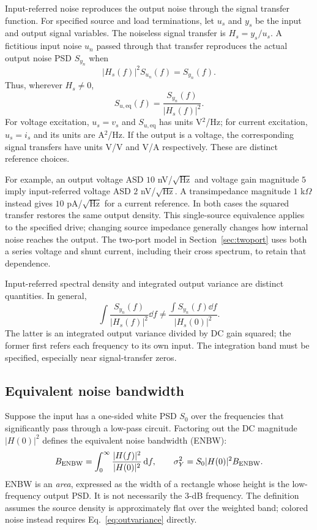 Input-referred noise reproduces the output noise through the signal transfer function. For specified source and load terminations, let $u_s$ and $y_s$ be the input and output signal variables. The noiseless signal transfer is $H_s=y_s/u_s$. A fictitious input noise $u_n$ passed through that transfer reproduces the actual output noise PSD $S_{y_n}$ when
\[
|H_s(f)|^2S_{u_n}(f)=S_{y_n}(f).
\]
Thus, wherever $H_s\neq0$,
\begin{equation}
\boxed{S_{u,\mathrm{eq}}(f)=\frac{S_{y_n}(f)}{|H_s(f)|^2}.}
\end{equation}
For voltage excitation, $u_s=v_s$ and $S_{u,\mathrm{eq}}$ has units V$^2$/Hz; for current excitation, $u_s=i_s$ and its units are A$^2$/Hz. If the output is a voltage, the corresponding signal transfers have units V/V and V/A respectively. These are distinct reference choices.
\InputReferralFigure

For example, an output voltage ASD $10$ nV/$\sqrt{\mathrm{Hz}}$ and voltage gain magnitude $5$ imply input-referred voltage ASD $2$ nV/$\sqrt{\mathrm{Hz}}$. A transimpedance magnitude $1$ k$\Omega$ instead gives $10$ pA/$\sqrt{\mathrm{Hz}}$ for a current reference. In both cases the squared transfer restores the same output density. This single-source equivalence applies to the specified drive; changing source impedance generally changes how internal noise reaches the output. The two-port model in Section~\ref{sec:twoport} uses both a series voltage and shunt current, including their cross spectrum, to retain that dependence.

Input-referred spectral density and integrated output variance are distinct quantities. In general,
\[
\int\frac{S_{y_n}(f)}{|H_s(f)|^2}\dd f
\neq\frac{\int S_{y_n}(f)\dd f}{|H_s(0)|^2}.
\]
The latter is an integrated output variance divided by DC gain squared; the former first refers each frequency to its own input. The integration band must be specified, especially near signal-transfer zeros.

\subsection{Equivalent noise bandwidth}
\label{sec:shaping}
Suppose the input has a one-sided white PSD $S_0$ over the frequencies that significantly pass through a low-pass circuit. Factoring out the DC magnitude $|H(0)|^2$ defines the equivalent noise bandwidth (ENBW):
\begin{equation}
B_{\mathrm{ENBW}}=\int_0^\infty\frac{|H(f)|^2}{|H(0)|^2}\,\mathrm d f,
\qquad \sigma_Y^2=S_0|H(0)|^2B_{\mathrm{ENBW}}.\label{eq:enbw}
\end{equation}
ENBW is an \emph{area}, expressed as the width of a rectangle whose height is the low-frequency output PSD. It is not necessarily the $3$-dB frequency. The definition assumes the source density is approximately flat over the weighted band; colored noise instead requires Eq.~\eqref{eq:outvariance} directly.

